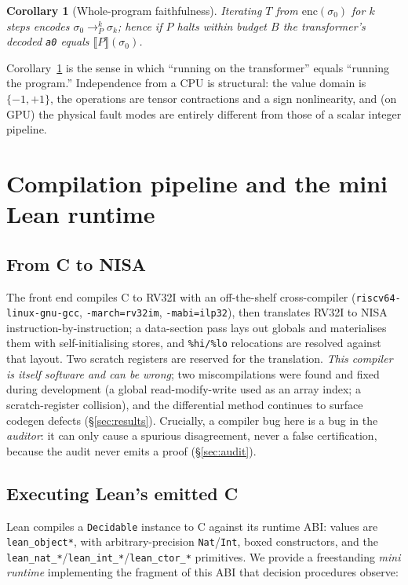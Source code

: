 \documentclass[11pt]{article}
\theoremstyle{definition}
\theoremstyle{plain}
\newtheorem{corollary}{Corollary}
\theoremstyle{remark}
\newcommand{\step}{\longrightarrow}
\newcommand{\bp}{\{-1,+1\}}
\newcommand{\sem}[1]{\llbracket #1 \rrbracket}
\begin{document}
\begin{corollary}[Whole-program faithfulness]\label{cor:whole}
Iterating $T$ from $\mathrm{enc}(\sigma_0)$ for $k$ steps encodes $\sigma_0 \step_P^{k} \sigma_k$;
hence if $P$ halts within budget $B$ the transformer's decoded \texttt{a0} equals $\sem{P}(\sigma_0)$.
\end{corollary}

Corollary~\ref{cor:whole} is the sense in which ``running on the transformer'' equals ``running the
program.'' Independence from a CPU is structural: the value domain is $\bp$, the operations are tensor
contractions and a sign nonlinearity, and (on GPU) the physical fault modes are entirely different from
those of a scalar integer pipeline.

\section{Compilation pipeline and the mini Lean runtime}\label{sec:pipeline}

\subsection{From C to NISA}
The front end compiles C to RV32I with an off-the-shelf cross-compiler
(\texttt{riscv64-linux-gnu-gcc}, \texttt{-march=rv32im}, \texttt{-mabi=ilp32}), then translates RV32I to
NISA instruction-by-instruction; a data-section pass lays out globals and materialises them with
self-initialising stores, and \texttt{\%hi/\%lo} relocations are resolved against that layout. Two
scratch registers are reserved for the translation. \emph{This compiler is itself software and can be
wrong}; two miscompilations were found and fixed during development (a global read-modify-write used as
an array index; a scratch-register collision), and the differential method continues to surface codegen
defects (\S\ref{sec:results}). Crucially, a compiler bug here is a bug in the \emph{auditor}: it can
only cause a spurious disagreement, never a false certification, because the audit never emits a proof
(\S\ref{sec:audit}).

\subsection{Executing Lean's emitted C}
Lean compiles a \texttt{Decidable} instance to C against its runtime ABI: values are
\texttt{lean\_object*}, with arbitrary-precision \texttt{Nat}/\texttt{Int}, boxed constructors, and the
\texttt{lean\_nat\_*}/\texttt{lean\_int\_*}/\texttt{lean\_ctor\_*} primitives. We provide a freestanding
\emph{mini runtime} implementing the fragment of this ABI that decision procedures observe:
\end{document}
